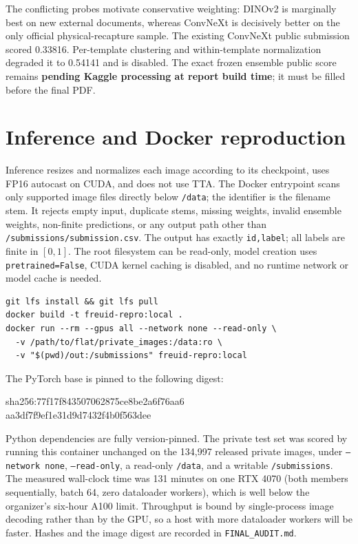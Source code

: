 \documentclass[10pt,a4paper]{article}
\begin{document}
The conflicting probes motivate conservative weighting: DINOv2 is marginally best on new external
documents, whereas ConvNeXt is decisively better on the only official physical-recapture sample.
The existing ConvNeXt public submission scored 0.33816. Per-template clustering and within-template
normalization degraded it to 0.54141 and is disabled. The exact frozen ensemble public score remains
\textbf{pending Kaggle processing at report build time}; it must be filled before the final PDF.

\section{Inference and Docker reproduction}
Inference resizes and normalizes each image according to its checkpoint, uses FP16 autocast on CUDA,
and does not use TTA. The Docker entrypoint scans only supported image files directly below
\texttt{/data}; the identifier is the filename stem. It rejects empty input, duplicate stems,
missing weights, invalid ensemble weights, non-finite predictions, or any output path other than
\texttt{/submissions/submission.csv}. The output has exactly \texttt{id,label}; all labels are finite
in $[0,1]$. The root filesystem can be read-only, model creation uses
\texttt{pretrained=False}, CUDA kernel caching is disabled, and no runtime network or model cache is
needed.

\begin{verbatim}
git lfs install && git lfs pull
docker build -t freuid-repro:local .
docker run --rm --gpus all --network none --read-only \
  -v /path/to/flat/private_images:/data:ro \
  -v "$(pwd)/out:/submissions" freuid-repro:local
\end{verbatim}

The PyTorch base is pinned to the following digest:
\begin{center}\small\ttfamily
sha256:77f17f843507062875ce8be2a6f76aa6\\
aa3df7f9ef1e31d9d7432f4b0f563dee
\end{center}
Python dependencies are fully version-pinned. The private test set was scored by running this
container unchanged on the 134,997 released private images, under \texttt{--network none},
\texttt{--read-only}, a read-only \texttt{/data}, and a writable \texttt{/submissions}. The measured
wall-clock time was 131 minutes on one RTX 4070 (both members sequentially, batch 64, zero dataloader
workers), which is well below the organizer's six-hour A100 limit. Throughput is bound by
single-process image decoding rather than by the GPU, so a host with more dataloader workers will be
faster. Hashes and the image digest are recorded in \texttt{FINAL\_AUDIT.md}.
\end{document}

